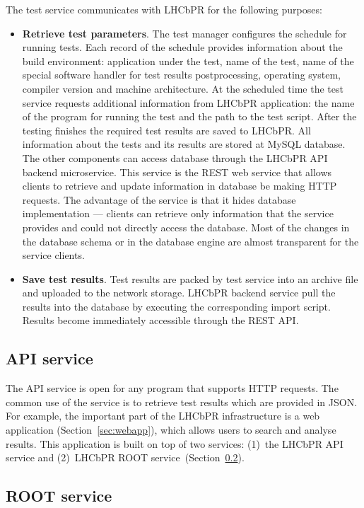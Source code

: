 \documentclass[a4paper]{jpconf}
\begin{document}
The test service communicates with LHCbPR for the following purposes:
\begin{itemize}
\item \textbf{Retrieve test parameters}. The test manager configures the schedule
for running tests. Each record of the schedule provides information about the
build environment: application under the test, name of the test, name of the
special software handler for test results postprocessing, operating system,
compiler version and machine architecture. At the scheduled time the test service
requests additional information from LHCbPR application: the name of the
program for running the test and the path to the test script. After the testing finishes
the required  test results are saved to LHCbPR. All information about the tests
and its results are stored at MySQL database. The other components can access
database through the LHCbPR API backend microservice. This service is the REST web
service that allows clients to retrieve and update information in database be making
HTTP requests. The advantage of the service is that it hides database
implementation --- clients can retrieve only information that the service provides
and could not directly access the database. Most of the changes in the database schema
or in the database engine are almost transparent for the service clients.

\item \textbf{Save test results}. Test results are packed by test service into
an archive file and uploaded to the network storage. LHCbPR backend service pull
the results into the database by executing the corresponding import script.
Results become immediately accessible through the REST API.
\end{itemize}

\subsection{API  service}
The API service is open for any program that supports HTTP
requests. The common use of the service is to retrieve test results which are
provided in JSON. For example, the important part of the LHCbPR
infrastructure is a web application (Section~\ref{sec:webapp}), which allows users
to search and analyse results. This
application is built on top of two services: (1)~the LHCbPR API service
and (2)~LHCbPR ROOT service~(Section~\ref{sec:rootapp}). 


\subsection{ROOT service}\label{sec:rootapp}
\end{document}
